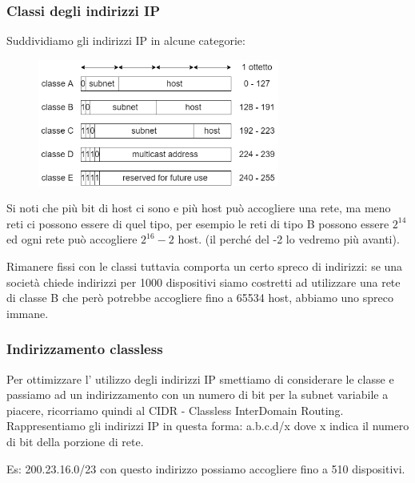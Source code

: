 \subsubsection{Classi degli indirizzi IP}
Suddividiamo gli indirizzi IP in alcune categorie:
\begin{figure}[H]
    \centering
    \includegraphics[width=300px]{images/5_Internetworking/ip_classes.png}
\end{figure}
Si noti che più bit di host ci sono e più host può accogliere una rete, ma meno reti ci possono essere di quel tipo, per esempio le reti di tipo B possono essere $2^{14}$ ed ogni rete può accogliere $2^{16} - 2$ host. (il perché del -2 lo vedremo più avanti).

Rimanere fissi con le classi tuttavia comporta un certo spreco di indirizzi: se una società chiede indirizzi per 1000 dispositivi siamo costretti ad utilizzare una rete di classe B che però potrebbe accogliere fino a 65534 host, abbiamo uno spreco immane.

\subsubsection{Indirizzamento classless}
Per ottimizzare l' utilizzo degli indirizzi IP smettiamo di considerare le classe e passiamo ad un indirizzamento con un numero di bit per la subnet variabile a piacere, ricorriamo quindi al CIDR - Classless InterDomain Routing.
Rappresentiamo gli indirizzi IP in questa forma: a.b.c.d/x dove x indica il numero di bit della porzione di rete.

Es: 200.23.16.0/23 con questo indirizzo possiamo accogliere fino a 510 dispositivi.


